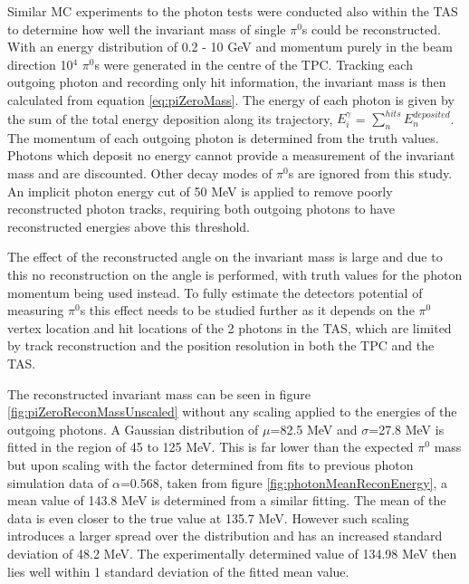 Similar MC experiments to the photon tests were conducted also within the TAS to determine how well the invariant mass of single $\pi^{0}$s could be reconstructed. With an energy distribution of 0.2 - 10 GeV and momentum purely in the beam direction 10$^{4}$ $\pi^{0}$s were generated in the centre of the TPC. Tracking each outgoing photon and recording only hit information, the invariant mass is then calculated from equation \ref{eq:piZeroMass}. The energy of each photon is given by the sum of the total energy deposition along its trajectory, $E^{\gamma}_{i}$ = $\sum^{hits}_{n}{E^{deposited}_{n}}$. The momentum of each outgoing photon is determined from the truth values.
Photons which deposit no energy cannot provide a measurement of the invariant mass and are discounted. Other decay modes of $\pi^{0}$s are ignored from this study. An implicit photon energy cut of 50 MeV is applied to remove poorly reconstructed photon tracks, requiring both outgoing photons to have reconstructed energies above this threshold.

The effect of the reconstructed angle on the invariant mass is large and due to this no reconstruction on the angle is performed, with truth values for the photon momentum being used instead. To fully estimate the detectors potential of measuring $\pi^{0}$s this effect needs to be studied further as it depends on the $\pi^{0}$ vertex location and hit locations of the 2 photons in the TAS, which are limited by track reconstruction and the position resolution in both the TPC and the TAS.

The reconstructed invariant mass can be seen in figure \ref{fig:piZeroReconMassUnscaled} without any scaling applied to the energies of the outgoing photons. A Gaussian distribution of $\mu$=82.5 MeV and $\sigma$=27.8 MeV is fitted in the region of 45 to 125 MeV. This is far lower than the expected $\pi^{0}$ mass but upon scaling with the factor determined from fits to previous photon simulation data of $\alpha$=0.568, taken from figure \ref{fig:photonMeanReconEnergy}, a mean value of 143.8 MeV is determined from a similar fitting. The mean of the data is even closer to the true value at 135.7 MeV. However such scaling introduces a larger spread over the distribution and has an increased standard deviation of 48.2 MeV. The experimentally determined value of 134.98 MeV then lies well within 1 standard deviation of the fitted mean value. 

